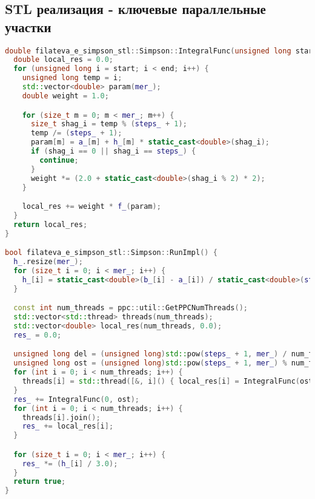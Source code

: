 \documentclass[12pt]{article}
\begin{document}
\subsection{STL реализация - ключевые параллельные участки}
\begin{lstlisting}[language=C++]
double filateva_e_simpson_stl::Simpson::IntegralFunc(unsigned long start, unsigned long end) {
  double local_res = 0.0;
  for (unsigned long i = start; i < end; i++) {
    unsigned long temp = i;
    std::vector<double> param(mer_);
    double weight = 1.0;

    for (size_t m = 0; m < mer_; m++) {
      size_t shag_i = temp % (steps_ + 1);
      temp /= (steps_ + 1);
      param[m] = a_[m] + h_[m] * static_cast<double>(shag_i);
      if (shag_i == 0 || shag_i == steps_) {
        continue;
      }
      weight *= (2.0 + static_cast<double>(shag_i % 2) * 2);
    }

    local_res += weight * f_(param);
  }
  return local_res;
}

bool filateva_e_simpson_stl::Simpson::RunImpl() {
  h_.resize(mer_);
  for (size_t i = 0; i < mer_; i++) {
    h_[i] = static_cast<double>(b_[i] - a_[i]) / static_cast<double>(steps_);
  }

  const int num_threads = ppc::util::GetPPCNumThreads();
  std::vector<std::thread> threads(num_threads);
  std::vector<double> local_res(num_threads, 0.0);
  res_ = 0.0;

  unsigned long del = (unsigned long)std::pow(steps_ + 1, mer_) / num_threads;
  unsigned long ost = (unsigned long)std::pow(steps_ + 1, mer_) % num_threads;
  for (int i = 0; i < num_threads; i++) {
    threads[i] = std::thread([&, i]() { local_res[i] = IntegralFunc(ost + (del * i), ost + (del * (i + 1))); });
  }
  res_ += IntegralFunc(0, ost);
  for (int i = 0; i < num_threads; i++) {
    threads[i].join();
    res_ += local_res[i];
  }

  for (size_t i = 0; i < mer_; i++) {
    res_ *= (h_[i] / 3.0);
  }
  return true;
}
\end{lstlisting}
\newpage
\end{document}
